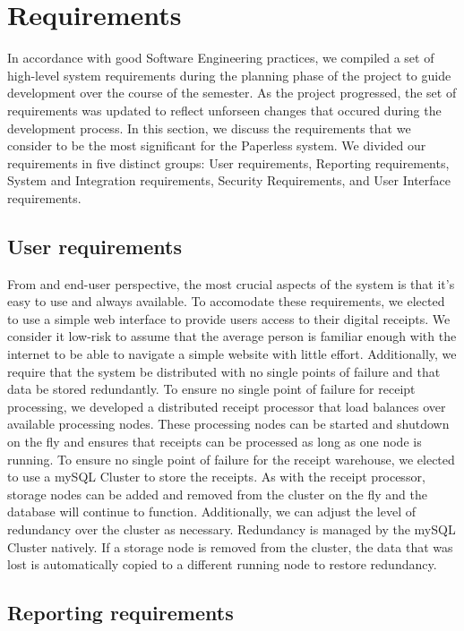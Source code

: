 \section{Requirements}
\label{sec:requirements}
In accordance with good Software Engineering practices, we compiled a set of high-level system requirements during the planning phase of the project to guide development over the course of the semester.  As the project progressed, the set of requirements was updated to reflect unforseen changes that occured during the development process.  In this section, we discuss the requirements that we consider to be the most significant for the Paperless system.  We divided our requirements in five distinct groups: User requirements, Reporting requirements, System and Integration requirements, Security Requirements, and User Interface requirements.

\subsection{User requirements}
\label{sec:requirements.user}

From and end-user perspective, the most crucial aspects of the system is that it's easy to use and always available.  To accomodate these requirements, we elected to use a simple web interface to provide users access to their digital receipts.  We consider it low-risk to assume that the average person is familiar enough with the internet to be able to navigate a simple website with little effort.  Additionally, we require that the system be distributed with no single points of failure and that data be stored redundantly.  To ensure no single point of failure for receipt processing, we developed a distributed receipt processor that load balances over available processing nodes.  These processing nodes can be started and shutdown on the fly and ensures that receipts can be processed as long as one node is running.  To ensure no single point of failure for the receipt warehouse, we elected to use a mySQL Cluster to store the receipts.  As with the receipt processor, storage nodes can be added and removed from the cluster on the fly and the database will continue to function.  Additionally, we can adjust the level of redundancy over the cluster as necessary.  Redundancy is managed by the mySQL Cluster natively.  If a storage node is removed from the cluster, the data that was lost is automatically copied to a different running node to restore redundancy.

\subsection{Reporting requirements}
\label{sec:requirements.reporting}

